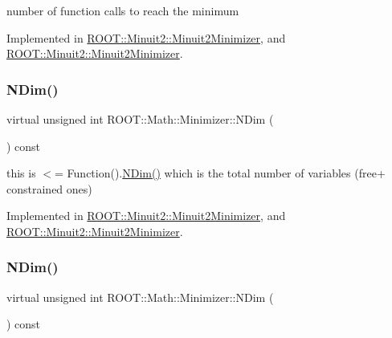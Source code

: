 number of function calls to reach the minimum 



Implemented in \mbox{\hyperlink{classROOT_1_1Minuit2_1_1Minuit2Minimizer_ab5faf7c3dc0b3743eee8352c62a6ccfd}{R\+O\+O\+T\+::\+Minuit2\+::\+Minuit2\+Minimizer}}, and \mbox{\hyperlink{classROOT_1_1Minuit2_1_1Minuit2Minimizer_ab5faf7c3dc0b3743eee8352c62a6ccfd}{R\+O\+O\+T\+::\+Minuit2\+::\+Minuit2\+Minimizer}}.

\mbox{\label{classROOT_1_1Math_1_1Minimizer_aecb9b9ee5c6a9fd7db3196ae3ac5e335}} 
\subsubsection{\texorpdfstring{NDim()}{NDim()}\hspace{0.1cm}{\footnotesize\ttfamily [1/2]}}
{\footnotesize\ttfamily virtual unsigned int R\+O\+O\+T\+::\+Math\+::\+Minimizer\+::\+N\+Dim (\begin{DoxyParamCaption}{ }\end{DoxyParamCaption}) const\hspace{0.3cm}{\ttfamily [pure virtual]}}

this is $<$= Function().\mbox{\hyperlink{classROOT_1_1Math_1_1Minimizer_aecb9b9ee5c6a9fd7db3196ae3ac5e335}{N\+Dim()}} which is the total number of variables (free+ constrained ones) 

Implemented in \mbox{\hyperlink{classROOT_1_1Minuit2_1_1Minuit2Minimizer_a6ed2c7d99296e222f0f43295e302eb9e}{R\+O\+O\+T\+::\+Minuit2\+::\+Minuit2\+Minimizer}}, and \mbox{\hyperlink{classROOT_1_1Minuit2_1_1Minuit2Minimizer_a6ed2c7d99296e222f0f43295e302eb9e}{R\+O\+O\+T\+::\+Minuit2\+::\+Minuit2\+Minimizer}}.

\mbox{\label{classROOT_1_1Math_1_1Minimizer_aecb9b9ee5c6a9fd7db3196ae3ac5e335}} 
\subsubsection{\texorpdfstring{NDim()}{NDim()}\hspace{0.1cm}{\footnotesize\ttfamily [2/2]}}
{\footnotesize\ttfamily virtual unsigned int R\+O\+O\+T\+::\+Math\+::\+Minimizer\+::\+N\+Dim (\begin{DoxyParamCaption}{ }\end{DoxyParamCaption}) const\hspace{0.3cm}{\ttfamily [pure virtual]}}

